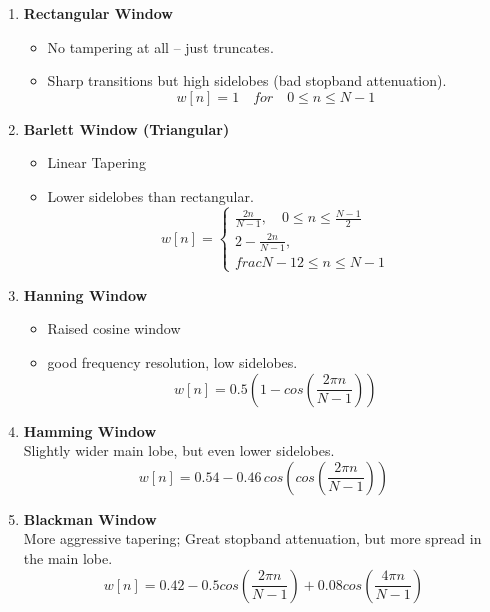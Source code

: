 \documentclass[12pt]{report}
\begin{document}
  \begin{enumerate}
    \item \textbf{Rectangular Window} 
      \begin{itemize}
        \item No tampering at all -- just truncates. 
        \item Sharp transitions but high sidelobes (bad stopband attenuation).\cite{chatgpt} \[ w[n] = 1 \quad for \quad 0 \leq n \leq N-1 \]

      \end{itemize}  
    \item \textbf{Barlett Window (Triangular)}
      \begin{itemize}
        \item Linear Tapering 
        \item Lower sidelobes than rectangular. \cite{chatgpt}
          \[ w[n] = 
          \begin{cases}
            \frac{2n}{N-1} , \quad 0 \leq n \leq \frac{N-1}{2} \\ 
            2 - \frac{2n}{N-1}, \quad \\frac{N-1}{2} \leq n \leq N-1
          \end{cases}\]
      \end{itemize}
    \item \textbf{Hanning Window}
      \begin{itemize}
        \item Raised cosine window 
        \item good frequency resolution, low sidelobes.\cite{chatgpt} \[ w[n] = 0.5 \left( 1 - cos \left( \frac{2 \pi n}{N-1} \right) \right) \]
      \end{itemize}
    \item \textbf{Hamming Window} \\ Slightly wider main lobe, but even lower sidelobes. \[ w[n] = 0.54 - 0.46 \, cos \left( cos \left( \frac{2 \pi n}{N-1} \right) \right) \]
    \item \textbf{Blackman Window} \\ More aggressive tapering; Great stopband attenuation, but more spread in the main lobe. 
      \[ w[n] = 0.42 - 0.5 cos \left( \frac{2 \pi n}{N-1} \right) + 0.08 cos \left( \frac{4 \pi n}{N-1} \right) \]
  \end{enumerate}
  
\end{document}
